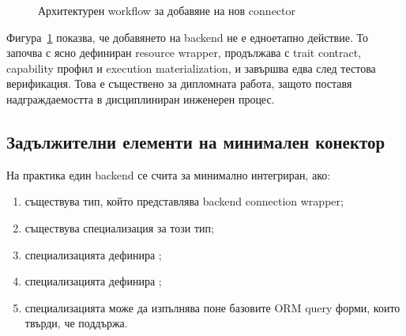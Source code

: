 \begin{figure}[H]
\centering
{}
\caption{Архитектурен workflow за добавяне на нов connector}
\label{fig:connector_workflow}
\end{figure}

Фигура~\ref{fig:connector_workflow} показва, че добавянето на backend не е едноетапно действие. То започва с ясно дефиниран resource wrapper, продължава с trait contract, capability профил и execution materialization, и завършва едва след тестова верификация. Това е съществено за дипломната работа, защото поставя надграждаемостта в дисциплиниран инженерен процес.

\subsection{Задължителни елементи на минимален конектор}

На практика един backend се счита за минимално интегриран, ако:

\begin{enumerate}[label=\arabic*.]
    \item съществува тип, който представлява backend connection wrapper;
    \item съществува специализация  за този тип;
    \item специализацията дефинира ;
    \item специализацията дефинира ;
    \item специализацията може да изпълнява поне базовите ORM query форми, които твърди, че поддържа.
\end{enumerate}

